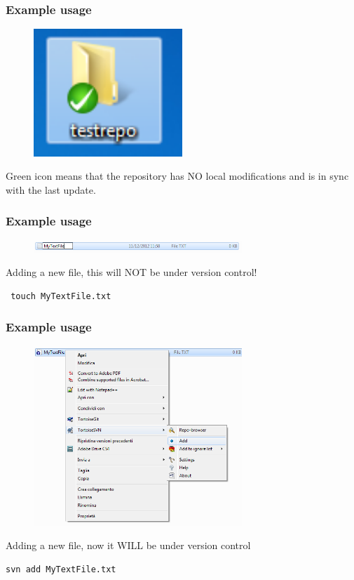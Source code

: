\documentclass[10pt]{beamer}
\begin{document}
\begin{frame}[fragile]
\frametitle{Example usage}
\begin{figure}[h]
 \centering
 \includegraphics[width=0.5\textwidth]{images/image5.png}
\end{figure}
Green icon means that the repository has NO local modifications and is in sync with the last update.
\end{frame}

\begin{frame}[fragile]
\frametitle{Example usage}
\begin{figure}[h]
 \centering
 \includegraphics[width=0.7\textwidth]{images/image6.png}
\end{figure}
Adding a new file, this will NOT be under version control!
\begin{verbatim}
 touch MyTextFile.txt
\end{verbatim}
\end{frame}

\begin{frame}[fragile]
\frametitle{Example usage}
\begin{figure}[h]
 \centering
 \includegraphics[width=0.7\textwidth]{images/image7.png}
\end{figure}
Adding a new file, now it WILL be under version control
\begin{verbatim}
svn add MyTextFile.txt
\end{verbatim}
\end{frame}
\end{document}
